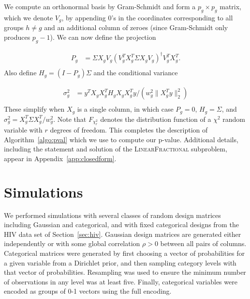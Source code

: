 \documentclass{imsart}
\newcommand{\norm}[1]{\lVert #1 \rVert}
\begin{document}
We compute an orthonormal basis by Gram-Schmidt and form a
$p_g \times p_g$ matrix, which we denote $V_g$, by appending
0's in the coordinates corresponding to all groups $h \neq g$ and
an additional column of zeroes (since Gram-Schmidt only produces $p_g-1$).
We can now define the projection

\begin{equation}
 \begin{aligned}
   \label{eq:proj}
   P_g &= \Sigma X_gV_g (V_g^T X_g^T \Sigma X_g V_g)^\dagger V_g^TX_g^T. \\
  \end{aligned}
\end{equation}
Also define $H_g = (I-P_g)\Sigma$ and the conditional variance

\begin{equation}
 \begin{aligned}
   \label{eq:cvar}
   \sigma^2_g &= y^TX_gX_g^T H_g X_gX_g^Ty / (w_g^2 \norm{X_g^Ty}_2^2) \\
 \end{aligned}
\end{equation}
These simplify when $X_g$ is a single column, in which case $P_g = 0$,
$H_g = \Sigma$, and $\sigma^2_g = X_g^T\Sigma X_g^T/w_g^2$.
Note that $F_{\chi^2_r}$ denotes the distribution function of a $\chi^2$
random variable with $r$ degrees of freedom. This completes the
description of Algorithm~\ref{algo:pval} which we use to compute our
p-value. Additional details, including the statement and solution of
the \textsc{LinearFractional} subproblem, appear in Appendix~\ref{app:closedform}.


\section{Simulations}
\label{sec:simulations}

We performed simulations with several classes of random design matrices
including Gaussian and categorical, and with fixed categorical designs
from the HIV data set of Section~\ref{sec:hiv}. Gaussian
design matrices are generated either independently or with some global
correlation $\rho > 0$ between all pairs of columns. Categorical matrices
were generated by first choosing a vector of probabilities for a given
variable from a Dirichlet prior, and then sampling category levels with
that vector of probabilities. Resampling was used to ensure the minimum
number of observations in any level was at least five. Finally, categorical
variables were encoded as groups of 0-1 vectors using the full encoding.
\end{document}
